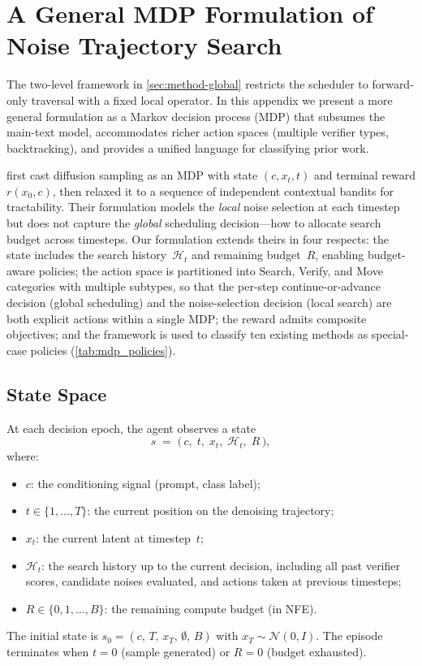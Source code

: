 \section{A General MDP Formulation of Noise Trajectory Search}
\label{sec:mdp}

The two-level framework in \cref{sec:method-global} restricts the
scheduler to forward-only traversal with a fixed local operator.
In this appendix we present a more general formulation as a
Markov decision process (MDP) that subsumes the main-text model,
accommodates richer action spaces (multiple verifier types, backtracking),
and provides a unified language for classifying prior work.

\citet{ramesh2025nts} first cast diffusion sampling as an MDP with
state $(c, x_t, t)$ and terminal reward $r(x_0, c)$, then relaxed
it to a sequence of independent contextual bandits for tractability.
Their formulation models the \emph{local} noise selection at each
timestep but does not capture the \emph{global} scheduling
decision---how to allocate search budget across timesteps.
Our formulation extends theirs in four respects:
the state includes the search history~$\mathcal{H}_t$ and remaining
budget~$R$, enabling budget-aware policies;
the action space is partitioned into Search, Verify, and Move
categories with multiple subtypes, so that the per-step
continue-or-advance decision (global scheduling) and the
noise-selection decision (local search) are both explicit actions
within a single MDP;
the reward admits composite objectives;
and the framework is used to classify ten existing methods as
special-case policies (\cref{tab:mdp_policies}).

\subsection{State Space}

At each decision epoch, the agent observes a state
\[
  s \;=\; \bigl(\,c,\; t,\; x_t,\; \mathcal{H}_t,\; R\,\bigr),
\]
where:
\begin{itemize}
  \item $c$: the conditioning signal (prompt, class label);
  \item $t \in \{1,\dots,T\}$: the current position on the denoising trajectory;
  \item $x_t$: the current latent at timestep~$t$;
  \item $\mathcal{H}_t$: the search history up to the current decision,
    including all past verifier scores, candidate noises evaluated, and
    actions taken at previous timesteps;
  \item $R \in \{0,1,\dots,B\}$: the remaining compute budget (in NFE).
\end{itemize}
The initial state is $s_0 = (c,\, T,\, x_T,\, \emptyset,\, B)$ with
$x_T \sim \mathcal{N}(0,I)$.
The episode terminates when $t = 0$ (sample generated) or $R = 0$
(budget exhausted).


